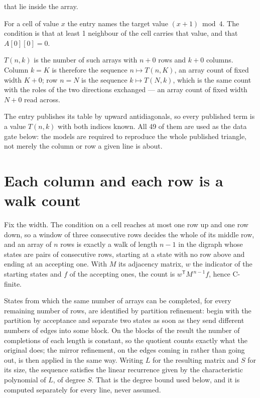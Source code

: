 \documentclass[11pt]{article}
\theoremstyle{definition}
\begin{document}
that lie inside the array.

For a cell of value $x$ the entry names the target value $(x + 1) \bmod 4$. The condition is that at least 1 neighbour of the cell carries that value, and that $A[0][0] = 0$.

$T(n,k)$ is the number of such arrays with $n + 0$ rows and $k + 0$ columns. Column $k = K$ is therefore the sequence $n \mapsto T(n,K)$, an array count of fixed width $K + 0$; row $n = N$ is the sequence $k \mapsto T(N,k)$, which is the same count with the roles of the two directions exchanged --- an array count of fixed width $N + 0$ read across.

The entry publishes its table by upward antidiagonals, so every published term is a value $T(n,k)$ with both indices known. All 49 of them are used as the data gate below: the models are required to reproduce the whole published triangle, not merely the column or row a given line is about.

\section{Each column and each row is a walk count}

Fix the width. The condition on a cell reaches at most one row up and one row down, so a window of three consecutive rows decides the whole of its middle row, and an array of $n$ rows is exactly a walk of length $n-1$ in the digraph whose states are pairs of consecutive rows, starting at a state with no row above and ending at an accepting one. With $M$ its adjacency matrix, $w$ the indicator of the starting states and $f$ of the accepting ones, the count is $w^{\mathsf T}M^{\,n-1}f$, hence C-finite.

States from which the same number of arrays can be completed, for every remaining number of rows, are identified by partition refinement: begin with the partition by acceptance and separate two states as soon as they send different numbers of edges into some block. On the blocks of the result the number of completions of each length is constant, so the quotient counts exactly what the original does; the mirror refinement, on the edges coming in rather than going out, is then applied in the same way. Writing $L$ for the resulting matrix and $S$ for its size, the sequence satisfies the linear recurrence given by the characteristic polynomial of $L$, of degree $S$. That is the degree bound used below, and it is computed separately for every line, never assumed.
\end{document}
